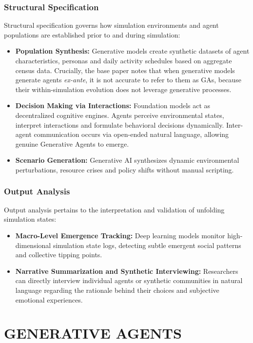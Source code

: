 \documentclass[12pt,a4paper]{report}
\begin{document}
\subsection{Structural Specification}
Structural specification governs how simulation environments and agent populations are established prior to and during simulation:
\begin{itemize}
    \item \textbf{Population Synthesis:} Generative models create synthetic datasets of agent characteristics, personas and daily activity schedules based on aggregate census data. Crucially, the base paper notes that when generative models generate agents \textit{ex-ante}, it is not accurate to refer to them as GAs, because their within-simulation evolution does not leverage generative processes.
    \item \textbf{Decision Making via Interactions:} Foundation models act as decentralized cognitive engines. Agents perceive environmental states, interpret interactions and formulate behavioral decisions dynamically. Inter-agent communication occurs via open-ended natural language, allowing genuine Generative Agents to emerge.
    \item \textbf{Scenario Generation:} Generative AI synthesizes dynamic environmental perturbations, resource crises and policy shifts without manual scripting.
\end{itemize}

\subsection{Output Analysis}
Output analysis pertains to the interpretation and validation of unfolding simulation states:
\begin{itemize}
    \item \textbf{Macro-Level Emergence Tracking:} Deep learning models monitor high-dimensional simulation state logs, detecting subtle emergent social patterns and collective tipping points.
    \item \textbf{Narrative Summarization and Synthetic Interviewing:} Researchers can directly interview individual agents or synthetic communities in natural language regarding the rationale behind their choices and subjective emotional experiences.
\end{itemize}

\chapter{GENERATIVE AGENTS}
\label{chap:generative_agents}
\end{document}
